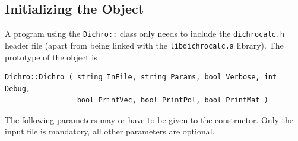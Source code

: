\documentclass[11pt, letterpaper]{article}
\begin{document}


\subsection{Initializing the Object}
\label{Sec:InitializeingTheObject}

A program using the \verb'Dichro::' class only needs to include the \verb'dichrocalc.h' header file (apart from being linked with the \verb'libdichrocalc.a' library). The prototype of the object is

\begin{verbatim}
Dichro::Dichro ( string InFile, string Params, bool Verbose, int Debug,
                 bool PrintVec, bool PrintPol, bool PrintMat )
\end{verbatim}

The following parameters may or have to be given to the constructor. Only the input file is mandatory, all other parameters are optional.
\end{document}
